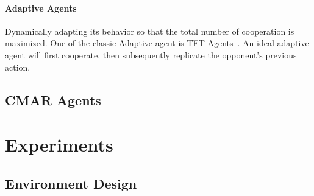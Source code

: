 \documentclass{article}
\begin{document}
\paragraph{Adaptive Agents}
Dynamically adapting its behavior so that the total number of cooperation is maximized.
One of the classic Adaptive agent is TFT Agents~\cite{nowak1993strategy}.
An ideal adaptive agent will first cooperate,
then subsequently replicate the opponent's previous action.
\subsection{CMAR Agents}

\section{Experiments}
\subsection{Environment Design}



\end{document}
